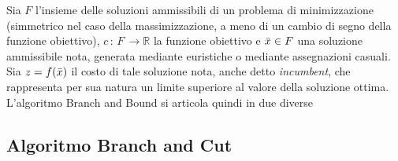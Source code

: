 Sia $F$ l'insieme delle soluzioni ammissibili di un problema di minimizzazione (simmetrico nel caso della massimizzazione, a meno di un 
cambio di segno della funzione obiettivo), $c \, : \, F \, \rightarrow \mathbb{R} $ la funzione obiettivo e $\Bar{x} \in F$ una 
soluzione ammissibile nota, generata mediante euristiche o mediante assegnazioni casuali. Sia $z=f(\Bar{x})$ il costo di tale soluzione
nota, anche detto \textit{incumbent}, che rappresenta per sua natura un limite superiore al valore della soluzione ottima.
L'algoritmo Branch and Bound si articola quindi in due diverse 

\subsection{Algoritmo Branch and Cut}